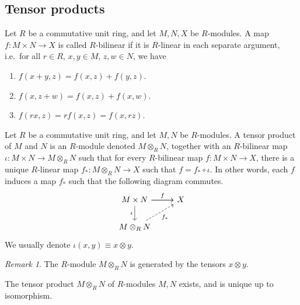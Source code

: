 \documentclass[11pt]{article}
\theoremstyle{definition}
\theoremstyle{remark}
\newtheorem*{remark}{Remark}
\numberwithin{equation}{section}
\begin{document}
    \subsection{Tensor products}

    \begin{definition}
        Let $R$ be a commutative unit ring, and let $M, N, X$ be $R$-modules. A map
        $f\colon M\times N \to X$ is called $R$-bilinear if it is $R$-linear in each
        separate argument, i.e.\ for all $r \in R$, $x, y \in M$, $z, w \in N$, we
        have \begin{enumerate}
            \itemsep0em
            \item $f(x + y, z) = f(x, z) + f(y, z)$.
            \item $f(x, z + w) = f(x, z) + f(x, w)$.
            \item $f(rx, z) = rf(x, z) = f(x, rz)$.
        \end{enumerate}
    \end{definition}

    \begin{definition}
        Let $R$ be a commutative unit ring, and let $M, N$ be $R$-modules. A tensor
        product of $M$ and $N$ is an $R$-module denoted $M\otimes_R N$, together with
        an $R$-bilinear map $\iota\colon M\times N \to M\otimes_R N$ such that for
        every $R$-bilinear map $f\colon M \times N \to X$, there is a unique
        $R$-linear map $f_*\colon M\otimes_R N \to X$ such that $f = f_*\circ \iota$.
        In other words, each $f$ induces a map $f_*$ such that the following diagram
        commutes. \[
            \begin{tikzcd}
                {M\times N} & X \\
                {M\otimes_R N}
                \arrow[from=1-1, to=1-2]
                \arrow["f", from=1-1, to=1-2]
                \arrow["\iota"', from=1-1, to=2-1]
                \arrow["{f_*}"', dashed, from=2-1, to=1-2]
            \end{tikzcd}
        \] We usually denote $\iota(x, y) \equiv x\otimes y$.

        \begin{remark}
            The $R$-module $M\otimes_R N$ is generated by the tensors $x\otimes y$.
        \end{remark}
    \end{definition}

    \begin{theorem}
        The tensor product $M\otimes_R N$ of $R$-modules $M, N$ exists, and is unique
        up to isomorphism.
    \end{theorem}
\end{document}
